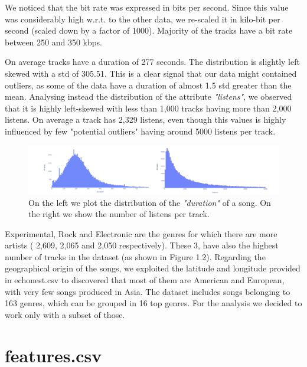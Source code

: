 We noticed that the bit rate was expressed in bits per second. Since this value was considerably high w.r.t. to the other data, we re-scaled it in kilo-bit per second (scaled down by a factor of 1000).
Majority of the tracks have a bit rate between 250 and 350 kbps.

On average tracks have a duration of 277 seconds. The distribution is slightly left skewed with a std of 305.51. This is a clear signal that our data might contained outliers, as some of the data have a duration of almost 1.5 std greater than the mean. Analysing instead the distribution of the attribute \textit{"listens"}, we observed that it is highly left-skewed with less than 1,000 tracks having more than 2,000 listens. On average a track has 2,329 listens, even though this values is highly influenced by few "potential outliers" having around 5000 listens per track. 

\begin{figure}[hp]
  \centering
  \includegraphics[width=1.01\linewidth]{images/duration-listens_tracks.csv.png}
  \caption{On the left we plot the distribution of the \textit{"duration"} of a song. On the right we show the number of listens per track.}
\end{figure} 

Experimental, Rock and Electronic are the genres for which there are more artists ( 2,609, 2,065 and 2,050 respectively). These 3, have also the highest number of tracks in the dataset (as shown in Figure 1.2). Regarding the geographical origin of the songs, we exploited the latitude and longitude provided in echonest.csv to discovered that most of them are American and European, with very few songs produced in Asia.
The dataset includes songs belonging to 163 genres, which can be grouped in 16 top genres. For the analysis we decided to work only with a subset of those.

\section{features.csv}

